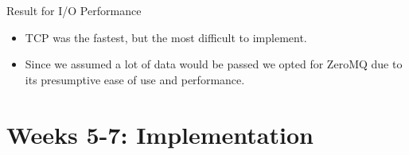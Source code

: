 \documentclass{beamer}
\begin{document}
    \begin{frame}{Result for I/O Performance}
    \begin{itemize}[<+-|alert@+>]
        \item TCP was the fastest, but the most difficult to implement.
        \item Since we assumed a lot of data would be passed we opted for ZeroMQ
              due to its presumptive ease of use and performance.
    \end{itemize}
    \end{frame}


    \section{Weeks 5-7: Implementation}
\end{document}
